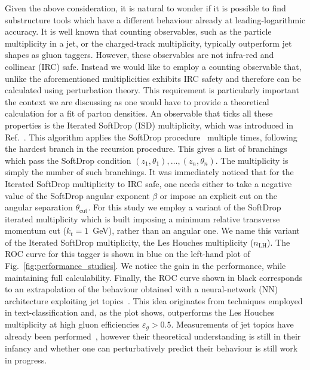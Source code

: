 Given the above consideration, it is natural to wonder if it is possible to find substructure tools
which have a different behaviour already at leading-logarithmic
accuracy.
%
It is well known that counting observables, such as the particle multiplicity in a jet, or the charged-track multiplicity, typically outperform jet shapes as gluon taggers. However, these observables are not infra-red and collinear (IRC) safe. Instead we would like to employ  a counting observable that, unlike the aforementioned multiplicities exhibits IRC safety and therefore can be calculated using perturbation theory. This requirement is particularly important the context we are discussing as one would have to provide a theoretical calculation for a fit of parton densities. 
%
An observable that ticks all these properties is the Iterated SoftDrop (ISD) multiplicity, which was introduced in Ref.~\cite{Frye:2017yrw}.
%
This algorithm applies the SoftDrop procedure~\cite{Larkoski:2014wba} multiple
times, following the hardest branch in
the recursion procedure. This gives a list of
branchings which pass the SoftDrop condition
$(z_1,\theta_1), \dots, (z_n,\theta_n)$. The multiplicity is simply the number of such branchings.
%
It was immediately noticed that for the Iterated SoftDrop multiplicity to IRC safe, one needs either to take a negative value of the SoftDrop angular exponent $\beta$ or impose an explicit cut on the angular separation  $\theta_\text{cut}$.
%
For this study we employ a variant of the SoftDrop iterated multiplicity which is built imposing a minimum relative transverse momentum cut ($k_t=1$~GeV), rather than an angular one. We name this variant of the Iterated SoftDrop multiplicity, the Les Houches multiplicity ($n_\text{LH}$).
The ROC curve for this tagger is shown in blue on the left-hand plot of  Fig.~\ref{fig:performance_studies}. We notice the gain in the performance, while maintaining full calculability. 
%
Finally, the ROC curve shown in black corresponds to an extrapolation of the behaviour obtained with a neural-network (NN) architecture exploiting jet topics~\cite{Metodiev:2018ftz,Komiske:2018vkc}. This idea originates from techniques employed in text-classification and, as the plot shows, outperforms the Les Houches multiplicity at high gluon efficiencies $\varepsilon_g > 0.5$. Measurements of jet topics have already been performed~\cite{Aad:2019onw}, however their theoretical understanding is still in their infancy and whether one can perturbatively predict their behaviour is still work in progress.

